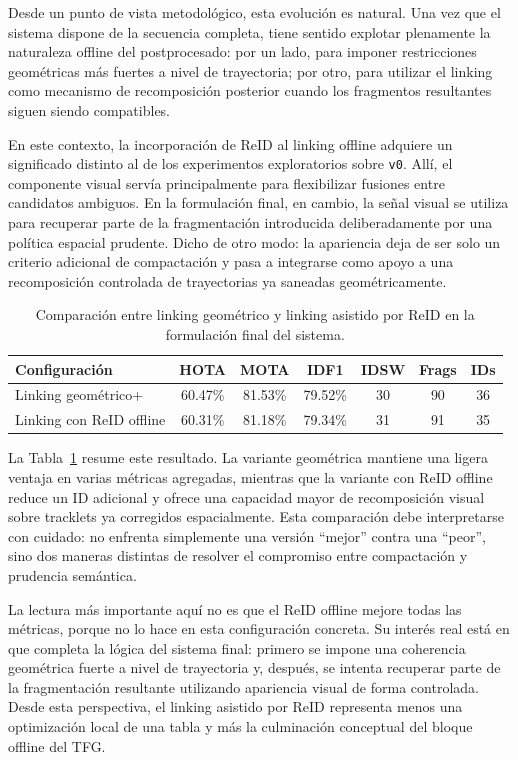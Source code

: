 \documentclass[../MAIN.tex]{subfiles}
\begin{document}
	Desde un punto de vista metodológico, esta evolución es natural. Una vez que el sistema dispone de la secuencia completa, tiene sentido explotar plenamente la naturaleza offline del postprocesado: por un lado, para imponer restricciones geométricas más fuertes a nivel de trayectoria; por otro, para utilizar el linking como mecanismo de recomposición posterior cuando los fragmentos resultantes siguen siendo compatibles.
	
	En este contexto, la incorporación de ReID al linking offline adquiere un significado distinto al de los experimentos exploratorios sobre \texttt{v0}. Allí, el componente visual servía principalmente para flexibilizar fusiones entre candidatos ambiguos. En la formulación final, en cambio, la señal visual se utiliza para recuperar parte de la fragmentación introducida deliberadamente por una política espacial prudente. Dicho de otro modo: la apariencia deja de ser solo un criterio adicional de compactación y pasa a integrarse como apoyo a una recomposición controlada de trayectorias ya saneadas geométricamente.
	
	\begin{table}[H]
		\centering
		\caption{Comparación entre linking geométrico y linking asistido por ReID en la formulación final del sistema.}
		\label{tab:cap10_formulacion_final}
		\begin{tabular}{lcccccc}
			\toprule
			\textbf{Configuración} & \textbf{HOTA} & \textbf{MOTA} & \textbf{IDF1} & \textbf{IDSW} & \textbf{Frags} & \textbf{IDs} \\
			\midrule
			Linking geométrico+ & 60.47\% & 81.53\% & 79.52\% & 30 & 90 & 36 \\
			Linking con ReID offline & 60.31\% & 81.18\% & 79.34\% & 31 & 91 & 35 \\
			\bottomrule
		\end{tabular}
	\end{table}
	
	La Tabla~\ref{tab:cap10_formulacion_final} resume este resultado. La variante geométrica mantiene una ligera ventaja en varias métricas agregadas, mientras que la variante con ReID offline reduce un ID adicional y ofrece una capacidad mayor de recomposición visual sobre tracklets ya corregidos espacialmente. Esta comparación debe interpretarse con cuidado: no enfrenta simplemente una versión “mejor” contra una “peor”, sino dos maneras distintas de resolver el compromiso entre compactación y prudencia semántica.
	
	La lectura más importante aquí no es que el ReID offline mejore todas las métricas, porque no lo hace en esta configuración concreta. Su interés real está en que completa la lógica del sistema final: primero se impone una coherencia geométrica fuerte a nivel de trayectoria y, después, se intenta recuperar parte de la fragmentación resultante utilizando apariencia visual de forma controlada. Desde esta perspectiva, el linking asistido por ReID representa menos una optimización local de una tabla y más la culminación conceptual del bloque offline del TFG.
	
\end{document}
